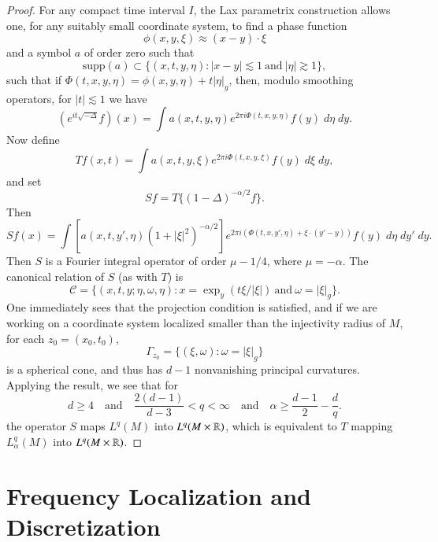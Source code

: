 \begin{proof}
    For any compact time interval $I$, the Lax parametrix construction allows one, for any suitably small coordinate system, to find a phase function
    \[ \phi(x,y,\xi) \approx (x - y) \cdot \xi \]
    and a symbol $a$ of order zero such that
    \[ \text{supp}(a) \subset \{ (x,t,y,\eta) : |x - y| \lesssim 1\ \text{and}\ |\eta| \gtrsim 1 \}, \]
    such that if $\Phi(t,x,y,\eta) = \phi(x,y,\eta) + t |\eta|_g$, then, modulo smoothing operators, for $|t| \lesssim 1$ we have
    \[ (e^{it \sqrt{-\Delta}} f)(x) = \int a(x,t,y,\eta) e^{2 \pi i \Phi(t,x,y,\eta)} f(y)\; d\eta\; dy. \]
    Now define
    \[ Tf(x,t) = \int a(x,t,y,\xi) e^{2 \pi i \Phi(t,x,y,\xi)} f(y)\; d\xi\; dy, \]
    and set
    \[ Sf = T \{ (1-\Delta)^{-\alpha/2} f \}. \]
    Then 
    \[ Sf(x) = \int \left[ a(x,t,y',\eta) (1 + |\xi|^2)^{-\alpha / 2} \right] e^{2 \pi i (\Phi(t,x,y',\eta) + \xi \cdot (y' - y))} f(y)\; d\eta\; dy'\; dy. \]
    Then $S$ is a Fourier integral operator of order $\mu - 1/4$, where $\mu = - \alpha$. The canonical relation of $S$ (as with $T$) is
    \[ \mathcal{C} = \{ (x,t,y; \eta, \omega, \eta) : x = \exp_y(t \xi / |\xi|)\ \text{and}\ \omega = |\xi|_g \}. \]
    One immediately sees that the projection condition is satisfied, and if we are working on a coordinate system localized smaller than the injectivity radius of $M$, for each $z_0 = (x_0,t_0)$,
    \[ \Gamma_{z_0} = \{ (\xi, \omega) : \omega = |\xi|_g \} \]
    is a spherical cone, and thus has $d-1$ nonvanishing principal curvatures. Applying the result, we see that for
    \[ d \geq 4 \quad\text{and}\quad \frac{2(d-1)}{d-3} < q < \infty \quad\text{and}\quad \alpha \geq \frac{d-1}{2} - \frac{d}{q}. \]
    the operator $S$ maps $L^q(M)$ into $L^q(M \times \operatorname{\mathbb{R}})$, which is equivalent to $T$ mapping $L^q_\alpha(M)$ into $L^q(M \times \operatorname{\mathbb{R}})$.
\end{proof}

\section{Frequency Localization and Discretization}

